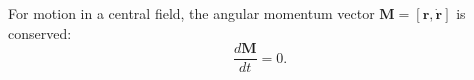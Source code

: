 For motion in a central field, the angular momentum vector $\mathbf{M} = [\mathbf{r}, \dot{\mathbf{r}}]$ is conserved:
$$\frac{d\mathbf{M}}{dt} = 0.$$
